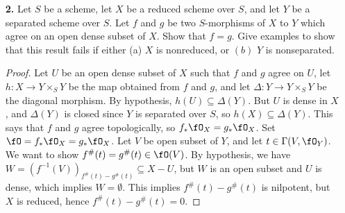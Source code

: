 \documentclass[a4paper]{article}
\begin{document}
\begin{enumerate} [label=\textbf{\arabic*.}, leftmargin=0em]
\begin{proof}
    It follows from these lemmas that if $f : A \to B$ is integral and $C$ is any $A$-algebra, then the mapping $(f \otimes 1)^* : \text{Spec}(B \otimes_A C) \to \spec{C}$ is a closed map. Let $f : X \to Y$ be a finite morphism of schemes. A finite morphism is an affine morphism (Ex. 3.4), so by (4.6f) we reduce to the case when $X = \spec{B}$ and $Y = \spec{A}$, where $B$ is a finite $A$-module (hence integral over $A$), and $f$ is induced by a ring homomorphism $A \to B$. Morphisms between affine schemes are separated (4.1), and finite morphisms are of finite type, so it remains to show $f$ is universally closed. If $Y' \to Y$ is any morphism, then we want to show $X \times_Y Y' \to Y'$ is a closed mapping. There is an open cover of $Y'$ by spectra of $A$-algebras $C_i$ so that the fiber product $X \times_Y Y'$ is covered by spectra of $B \otimes_A C_i$. By the above remarks, the morphisms $\text{Spec}(B \otimes_A C_i) \to \spec{C_i}$ are closed, hence $X \times_Y Y' \to Y'$ is closed.
\end{proof}

\item[\textbf{2.}] Let $S$ be a scheme, let $X$ be a reduced scheme over $S$, and let $Y$ be a separated scheme over $S$. Let $f$ and $g$ be two $S$-morphisms of $X$ to $Y$ which agree on an open dense subset of $X$. Show that $f = g$. Give examples to show that this result fails if either (a) $X$ is nonreduced, or $(b)$ $Y$ is nonseparated.

\begin{proof}
    Let $U$ be an open dense subset of $X$ such that $f$ and $g$ agree on $U$, let $h : X \to Y \times_S Y$ be the map obtained from $f$ and $g$, and let $\Delta : Y \to Y \times_S Y$ be the diagonal morphism. By hypothesis, $h(U) \subseteq \Delta(Y)$. But $U$ is dense in $X$, and $\Delta(Y)$ is closed since $Y$ is separated over $S$, so $h(X) \subseteq \Delta(Y)$. This says that $f$ and $g$ agree topologically, so $f_*\fO_X = g_*\fO_X$. Set $\fO = f_* \fO_X = g_*\fO_X$. Let $V$ be open subset of $Y$, and let $t \in \Gamma(V, \fO_Y)$. We want to show $f^\#(t) = g^\#(t) \in \fO(V)$. By hypothesis, we have $W = (f^{-1}(V))_{f^\#(t) - g^\#(t)} \subseteq X - U$, but $W$ is an open subset and $U$ is dense, which implies $W = \emptyset$. This implies $f^\#(t) - g^\#(t)$ is nilpotent, but $X$ is reduced, hence $f^\#(t) - g^\#(t) = 0$.


\end{proof}
\end{enumerate}
\end{document}
